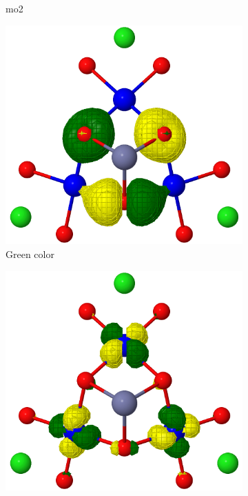 \documentclass[12pt]{report}
\numberwithin{equation}{section}
\begin{document}
\begin{figure}
\begin{subfigure}{0.3\linewidth}
		\caption{mo2}
		\label{fig:subfigB}
	\end{subfigure}
	\begin{subfigure}{0.3\linewidth}
	        \includegraphics[width=\linewidth]{Images/mo3.trimer.png}
	        \caption{Green color}
	        \label{fig:subfigC}
         \end{subfigure}
	\caption{Showing three cars in different colors horizontally.}
	\label{fig:subfigures}
    \begin{subfigure}{0.3\linewidth}
        \includegraphics[width=\linewidth]{Images/mo4.trimer.png}

\end{subfigure}
\end{figure}
\end{document}
